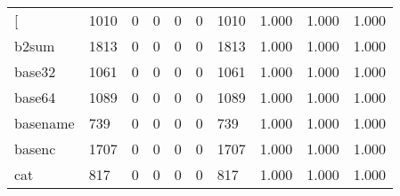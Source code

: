 \begin{longtable}{lp{2.0cm}p{2.0cm}p{2.0cm}p{2.0cm}p{2.0cm}p{2.0cm}p{2.0cm}p{2.0cm}p{2.0cm}}
\bottomrule
\endlastfoot
{[}         &                   1010 &                                  0 &                                 0 &                                0 &                                 0 &                            1010 &                                1.000 &                                  1.000 &                                1.000 \\
b2sum     &                   1813 &                                  0 &                                 0 &                                0 &                                 0 &                            1813 &                                1.000 &                                  1.000 &                                1.000 \\
base32    &                   1061 &                                  0 &                                 0 &                                0 &                                 0 &                            1061 &                                1.000 &                                  1.000 &                                1.000 \\
base64    &                   1089 &                                  0 &                                 0 &                                0 &                                 0 &                            1089 &                                1.000 &                                  1.000 &                                1.000 \\
basename  &                    739 &                                  0 &                                 0 &                                0 &                                 0 &                             739 &                                1.000 &                                  1.000 &                                1.000 \\
basenc    &                   1707 &                                  0 &                                 0 &                                0 &                                 0 &                            1707 &                                1.000 &                                  1.000 &                                1.000 \\
cat       &                    817 &                                  0 &                                 0 &                                0 &                                 0 &                             817 &                                1.000 &                                  1.000 &                                1.000 \\

\end{longtable}
